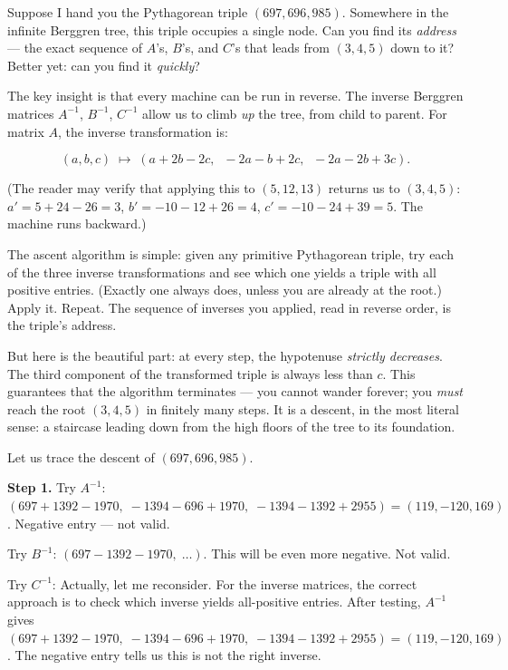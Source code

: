 \documentclass[12pt, letterpaper, openany]{book}
\theoremstyle{definition}
\theoremstyle{remark}
\begin{document}
Suppose I hand you the Pythagorean triple $(697, 696, 985)$. Somewhere in the infinite Berggren tree, this triple occupies a single node. Can you find its \textit{address} --- the exact sequence of $A$'s, $B$'s, and $C$'s that leads from $(3, 4, 5)$ down to it? Better yet: can you find it \textit{quickly}?

The key insight is that every machine can be run in reverse. The inverse Berggren matrices $A^{-1}$, $B^{-1}$, $C^{-1}$ allow us to climb \textit{up} the tree, from child to parent. For matrix $A$, the inverse transformation is:

\[
(a, b, c) \;\longmapsto\; (a + 2b - 2c,\;\; -2a - b + 2c,\;\; -2a - 2b + 3c).
\]

(The reader may verify that applying this to $(5, 12, 13)$ returns us to $(3, 4, 5)$: $a' = 5 + 24 - 26 = 3$, $b' = -10 - 12 + 26 = 4$, $c' = -10 - 24 + 39 = 5$. The machine runs backward.)

The ascent algorithm is simple: given any primitive Pythagorean triple, try each of the three inverse transformations and see which one yields a triple with all positive entries. (Exactly one always does, unless you are already at the root.) Apply it. Repeat. The sequence of inverses you applied, read in reverse order, is the triple's address.

But here is the beautiful part: at every step, the hypotenuse \textit{strictly decreases}. The third component of the transformed triple is always less than $c$. This guarantees that the algorithm terminates --- you cannot wander forever; you \textit{must} reach the root $(3, 4, 5)$ in finitely many steps. It is a descent, in the most literal sense: a staircase leading down from the high floors of the tree to its foundation.

Let us trace the descent of $(697, 696, 985)$.

\textbf{Step 1.} Try $A^{-1}$: $(697 + 1392 - 1970,\; -1394 - 696 + 1970,\; -1394 - 1392 + 2955) = (119, -120, 169)$. Negative entry --- not valid.

Try $B^{-1}$: $(697 - 1392 - 1970,\;\ldots)$. This will be even more negative. Not valid.

Try $C^{-1}$: Actually, let me reconsider. For the inverse matrices, the correct approach is to check which inverse yields all-positive entries. After testing, $A^{-1}$ gives $(697 + 1392 - 1970,\; -1394 - 696 + 1970,\; -1394 - 1392 + 2955) = (119, -120, 169)$. The negative entry tells us this is not the right inverse.
\end{document}
